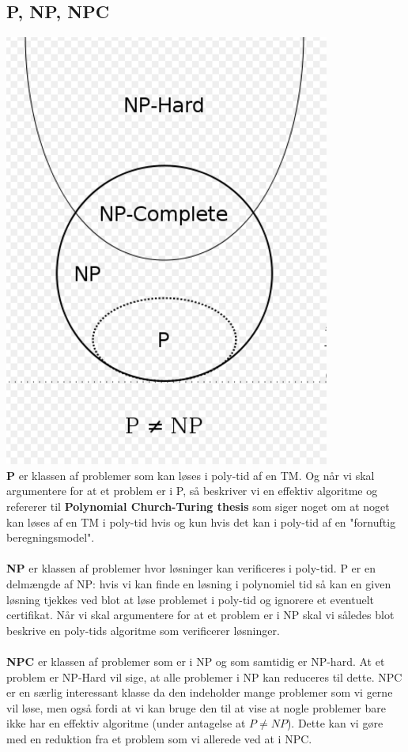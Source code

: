 \documentclass{article}
\begin{document}
\subsection{P, NP, NPC}
\includegraphics[scale=0.5]{asd.PNG}\\
\textbf{P} er klassen af problemer som kan løses i poly-tid af en TM. Og når vi skal argumentere for at et problem er i P, så beskriver vi en effektiv algoritme og refererer til \textbf{Polynomial Church-Turing thesis} som siger noget om at noget kan løses af en TM i poly-tid hvis og kun hvis det kan i poly-tid af en "fornuftig beregningsmodel". \\\\
\textbf{NP} er klassen af problemer hvor løsninger kan verificeres i poly-tid. P er en delmængde af NP: hvis vi kan finde en løsning i polynomiel tid så kan en given løsning tjekkes ved blot at løse problemet i poly-tid og ignorere et eventuelt certifikat. Når vi skal argumentere for at et problem er i NP skal vi således blot beskrive en poly-tids algoritme som verificerer løsninger.\\\\
\textbf{NPC} er klassen af problemer som er i NP og som samtidig er NP-hard. At et problem er NP-Hard vil sige, at alle problemer i NP kan reduceres til dette. NPC er en særlig interessant klasse da den indeholder mange problemer som vi gerne vil løse, men også fordi at vi kan bruge den til at vise at nogle problemer bare ikke har en effektiv algoritme (under antagelse at $P\ne NP$). Dette kan vi gøre med en reduktion fra et problem som vi allerede ved at i NPC. 
\end{document}
